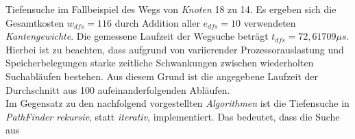 \documentclass[12pt]{article}
\begin{document}
Tiefensuche im Fallbeispiel des Wegs von \textit{Knoten} 18 zu 14. Es ergeben sich die Gesamtkosten $w_{dfs} = 116$ durch Addition aller $e_{dfs} = 10$ verwendeten \textit{Kantengewichte}. Die gemessene Laufzeit der Wegsuche beträgt $t_{dfs} = 72,61709\mu s$. Hierbei ist zu beachten, dass aufgrund von variierender Prozessorauslastung und Speicherbelegungen starke zeitliche Schwankungen zwischen wiederholten Suchabläufen bestehen. Aus diesem Grund ist die angegebene Laufzeit der Durchschnitt aus 100 aufeinanderfolgenden Abläufen.
\\
Im Gegensatz zu den nachfolgend vorgestellten \textit{Algorithmen} ist die Tiefensuche in \textit{PathFinder} \textit{rekursiv}, statt \textit{iterativ}, implementiert. Das bedeutet, dass die Suche aus
\end{document}
